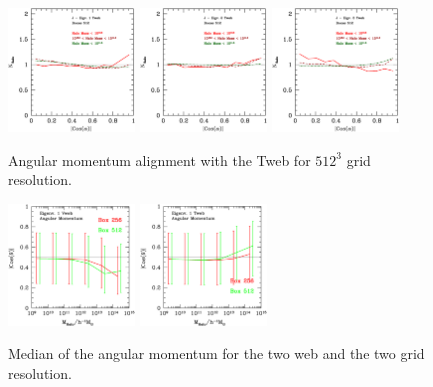 \documentclass[usenatbib]{mn2e}
\begin{document}
\begin{figure}
\includegraphics[width=0.30\textwidth]{../plot2/J/512_J_T1.ps}
\includegraphics[width=0.30\textwidth]{../plot2/J/512_J_T2.ps}
\includegraphics[width=0.30\textwidth]{../plot2/J/512_J_T3.ps}
\caption{Angular momentum alignment with the Tweb for $512^3$ grid resolution.}
\end{figure}


\begin{figure}
\includegraphics[width=0.30\textwidth]{../plot2/Mass/jVWeb.ps}
\includegraphics[width=0.30\textwidth]{../plot2/Mass/jTWeb.ps}
\caption{Median of the angular momentum for the two web  and the two grid resolution.}
\end{figure}
\end{document}
